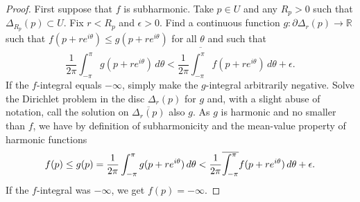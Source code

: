\documentclass[12pt,openany]{book}
\newcommand{\avoidbreak}{\postdisplaypenalty=100}
\newcommand{\R}{{\mathbb{R}}}
\theoremstyle{plain}
\theoremstyle{remark}
\theoremstyle{definition}
\theoremstyle{exercise}
\theoremstyle{example}
\begin{document}
\begin{proof}
First suppose that $f$ is subharmonic.  Take $p \in U$ and any $R_p > 0$
such that $\Delta_{R_p}(p) \subset U$.
Fix $r < R_p$ and $\epsilon > 0$.
Find a continuous function $g \colon \partial \Delta_r(p) \to \R$
such that $f(p+ re^{i\theta}) \leq g(p+re^{i\theta})$ for all $\theta$
and such that
\begin{equation*}
\frac{1}{2\pi} \int_{-\pi}^{\pi} g(p+re^{i\theta})\, d\theta <
\frac{1}{2\pi} \overline{\int_{-\pi}^{\pi}} f(p+re^{i\theta})\, d\theta + \epsilon .
\end{equation*}
If the $f$-integral equals $-\infty$, simply make the $g$-integral
arbitrarily negative.
Solve the Dirichlet problem in the disc $\Delta_r(p)$ for $g$ and,
with a slight abuse of notation,
call the solution on $\overline{\Delta_r(p)}$
also $g$.  As $g$ is harmonic and no smaller than $f$, we have by
definition of subharmonicity and the mean-value property of harmonic
functions
\begin{equation*}
f(p) \leq g(p) =
\frac{1}{2\pi} \int_{-\pi}^{\pi} g(p+re^{i\theta})\, d\theta <
\frac{1}{2\pi} \overline{\int_{-\pi}^{\pi}} f(p+re^{i\theta})\, d\theta + \epsilon .
\avoidbreak
\end{equation*}
If the $f$-integral was $-\infty$, we get $f(p) = -\infty$.


\end{proof}
\end{document}
